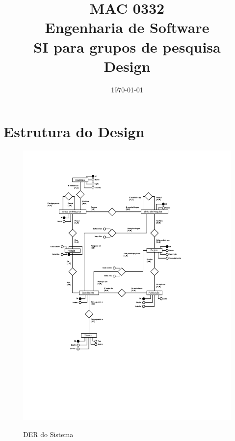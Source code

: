 \documentclass[11pt, a4paper]{article}
\title{MAC 0332\\
	Engenharia de Software\\
	SI para grupos de pesquisa\\
	Design}
\date{\today}
\begin{document}
	\maketitle
	\newpage
	
	\section{Estrutura do Design}
		
		\begin{figure}[h]
            \center
            \includegraphics[width=12cm]{SIGP-DER.pdf}
            \label{DER}
            \caption{DER do Sistema}
        \end{figure}
        \newpage
        
		
\end{document}
